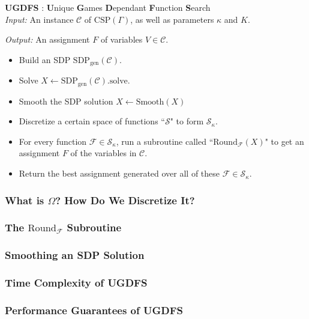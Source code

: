 \documentclass[letterpaper, 12pt]{article}
\numberwithin{equation}{section}
\begin{document}
\begin{algorithm} \textbf{UGDFS} : \textbf{U}nique \textbf{G}ames \textbf{D}ependant \textbf{F}unction \textbf{S}earch \\

\textit{Input: } An instance $\mathcal{C}$ of $\text{CSP}(\Gamma)$, as well as parameters $\kappa$ and $K$.

\textit{Output: } An assignment $F$ of variables $V \in \mathcal{C}$.
\begin{itemize}
\item Build an SDP $\text{SDP}_{\text{gen}}(\mathcal{C})$.
\item Solve $X \leftarrow \text{SDP}_{\text{gen}}(\mathcal{C}).\text{solve}$.
\item Smooth the SDP solution $X \leftarrow \text{Smooth}(X)$
\item Discretize a certain space of functions ``$\mathcal{S}$" to form $\mathcal{S}_{\kappa}$.
\item For every function $\mathcal{F} \in \mathcal{S}_{\kappa}$, run a subroutine called ``$\text{Round}_{\mathcal{F}}(X)$" to get an assignment $F$ of the variables in $\mathcal{C}$. 
\item Return the best assignment generated over all of these $\mathcal{F} \in \mathcal{S}_{\kappa}$.
\end{itemize}
\end{algorithm}

\subsubsection{What is $\Omega$? How Do We Discretize It?}

\subsubsection{The $\text{Round}_{\mathcal{F}}$ Subroutine}

\subsubsection{Smoothing an SDP Solution}

\subsubsection{Time Complexity of UGDFS}

\subsubsection{Performance Guarantees of UGDFS}
\end{document}
